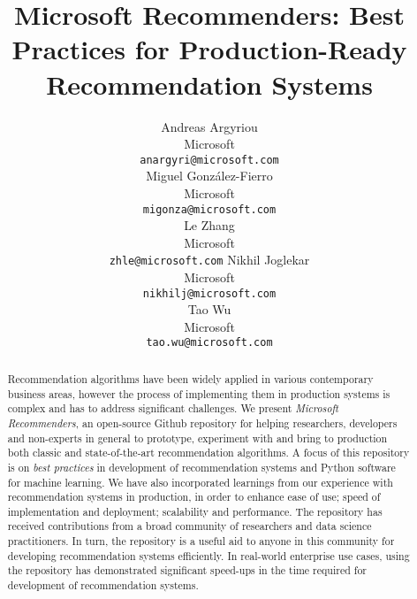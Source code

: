 \documentclass{article}
\title{Microsoft Recommenders: Best Practices for Production-Ready Recommendation Systems}
\author{%
  Andreas Argyriou \\
Microsoft \\ %
  \texttt{anargyri@microsoft.com} \\
\And
  Miguel Gonz{\'a}lez-Fierro \\
Microsoft \\ %
  \texttt{migonza@microsoft.com} \\
\And
  Le Zhang \\
Microsoft \\ %
  \texttt{zhle@microsoft.com} 
\And
  Nikhil Joglekar \\
Microsoft  \\ %
  \texttt{nikhilj@microsoft.com} \\
\And
  Tao Wu \\
Microsoft \\ %
  \texttt{tao.wu@microsoft.com} \\
}
\begin{document}
\maketitle

\begin{abstract}
Recommendation algorithms have been widely applied in various contemporary business areas, however the process of implementing them in production 
systems is complex and has to address significant challenges. We present {\em Microsoft Recommenders},  
an open-source Github repository for helping researchers, developers and non-experts in general to prototype, experiment with and
bring to production both classic and state-of-the-art recommendation algorithms.
A focus of this repository is on {\em best practices} in development of recommendation systems and Python software for machine learning.
We have also incorporated learnings from our experience with recommendation systems in production, in order to enhance ease of use; speed of 
implementation and deployment; scalability and performance. 
The repository has received contributions from a broad community of researchers and data science practitioners. 
In turn, the repository is a useful aid to anyone in this community for developing recommendation systems efficiently.
In real-world enterprise use cases, using the repository has demonstrated significant speed-ups in the time required for development of recommendation systems. 
\end{abstract}






%
%
% 
%
%
%














\end{document}
